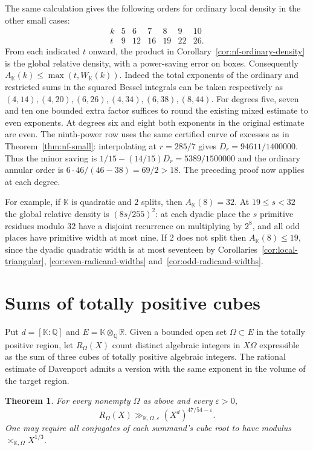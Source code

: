 \documentclass[11pt,letterpaper]{article}
\newtheorem{theorem}{Theorem}[section]
\theoremstyle{definition}
\numberwithin{equation}{section}
\begin{document}
The same calculation gives the following orders for ordinary local
density in the other small cases:
\[
\begin{array}{c|rrrrrr}
 k&5&6&7&8&9&10\\\hline
 t&9&12&16&19&22&26 .
\end{array}
\]
From each indicated $t$ onward, the product in
Corollary~\ref{cor:nf-ordinary-density} is the global relative density,
with a power-saving error on boxes. Consequently
$A_{\mathbb K}(k)\le\max(t,W_{\mathbb K}(k))$.
Indeed the total exponents of the ordinary and restricted sums in the
squared Bessel integrals can be taken respectively as
$(4,14),(4,20),(6,26),(4,34),(6,38),(8,44)$.
For degrees five, seven and ten one bounded extra factor suffices to
round the existing mixed estimate to even exponents. At degrees six
and eight both exponents in the original estimate are even. The
ninth-power row uses the same certified curve of excesses as in
Theorem~\ref{thm:nf-small}: interpolating at $r=285/7$ gives
$D_r=94611/1400000$. Thus the minor saving is
$1/15-(14/15)D_r=5389/1500000$ and the ordinary annular order is
$6\cdot46/(46-38)=69/2>18$. The preceding proof now applies at each
degree.

For example, if $\mathbb K$ is quadratic and $2$ splits, then
$A_{\mathbb K}(8)=32$. At $19\le s<32$ the global relative density
is $(8s/255)^2$: at each dyadic place the $s$ primitive residues
modulo $32$ have a disjoint recurrence on multiplying by $2^8$,
and all odd places have primitive width at most nine. If $2$ does
not split then $A_{\mathbb K}(8)\le19$, since the dyadic quadratic
width is at most seventeen by
Corollaries~\ref{cor:local-triangular}, \ref{cor:even-radicand-widths}
and~\ref{cor:odd-radicand-widths}.

\section{Sums of totally positive cubes}\label{nf3:cubes}
Put $d=[\mathbb K:\mathbb Q]$ and $E=\mathbb K\otimes_{\mathbb Q}\mathbb R$.
Given a bounded open set $\Omega\subset E$ in the totally positive region,
let $R_{\Omega}(X)$ count distinct algebraic integers in $X\Omega$ expressible
as the sum of three cubes of totally positive algebraic integers.
The rational estimate of Davenport \cite{nf3:dav} admits a version with the
same exponent in the volume of the target region.

\begin{theorem}\label{nf3:davenport}
For every nonempty $\Omega$ as above and every $\varepsilon>0$,
\[
 R_{\Omega}(X)\gg_{\mathbb K,\Omega,\varepsilon}(X^d)^{47/54-\varepsilon}.
\]
One may require all conjugates of each summand's cube root to have modulus
$\asymp_{\mathbb K,\Omega}X^{1/3}$.
\end{theorem}
\end{document}
